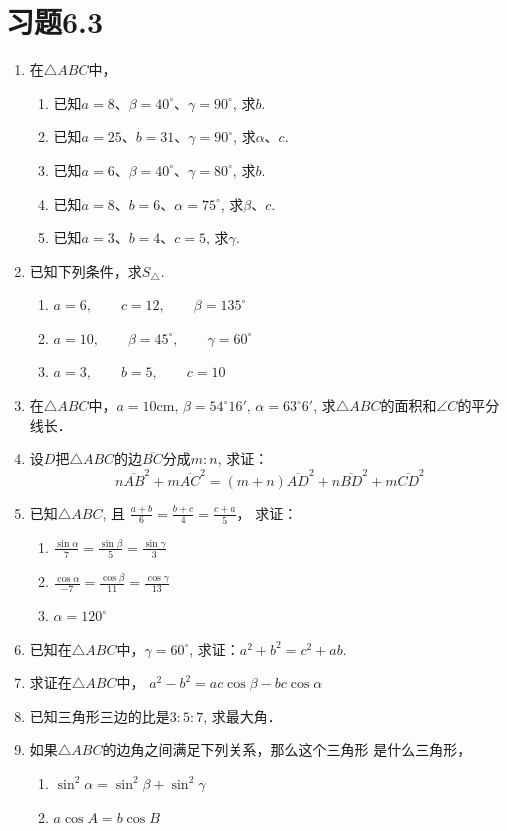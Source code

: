 \section*{习题6.3}
\begin{enumerate}
    \item 在$\triangle ABC$中，
\begin{enumerate}
    \item 已知$a=8$、$\beta=40^{\circ}$、$\gamma=90^{\circ}$, 求$b$.
    \item 已知$a=25$、$b=31$、$\gamma=90^{\circ}$, 求$\alpha$、$c$.
    \item 已知$a=6$、$\beta=40^{\circ}$、$\gamma=80^{\circ}$, 求$b$.
    \item 已知$a=8$、$b=6$、$\alpha=75^{\circ}$, 求$\beta$、$c$.
    \item 已知$a=3$、$b=4$、$c=5$, 求$\gamma$.
\end{enumerate}
\item  已知下列条件，求$S_{\triangle}$.
\begin{enumerate}
    \item $a=6,\qquad c=12,\qquad \beta =135^{\circ}$
    \item $a=10,\qquad \beta =45^{\circ},\qquad \gamma=60^{\circ}$
    \item $a=3,\qquad b=5,\qquad c=10$
\end{enumerate}

\item  在$\triangle ABC$中，$a=10$cm, $\beta =54^{\circ}16'$, $\alpha=63^{\circ}6'$, 求$\triangle ABC$的面积和$\angle C$的平分线长．
\item  设$D$把$\triangle ABC$的边$\overline{BC}$分成$m:n$, 求证：
\[n\overline{AB}^2+m \overline{AC}^2=(m+n)\overline{AD}^2+n\overline{BD}^2+m\overline{CD}^2\]
\item  已知$\triangle ABC$, 且
$\frac{a+b}{6}=\frac{b+c}{4}=\frac{c+a}{5}$，
求证：
\begin{enumerate}
    \item $\frac{\sin\alpha}{7}=\frac{\sin\beta}{5}=\frac{\sin\gamma}{3}$
    \item $\frac{\cos\alpha}{-7}=\frac{\cos\beta}{11}=\frac{\cos\gamma}{13}$
    \item $\alpha=120^{\circ}$
\end{enumerate}
\item  已知在$\triangle ABC$中，$\gamma=60^{\circ}$, 求证：$a^2+b^2=c^2+ab$.
\item  求证在$\triangle ABC$中，
$a^2-b^2=ac\cos\beta -bc\cos\alpha$
\item  已知三角形三边的比是$3:5:7$, 求最大角．
\item  如果$\triangle ABC$的边角之间满足下列关系，那么这个三角形
是什么三角形，
\begin{enumerate}
    \item $\sin^2\alpha=\sin^2\beta +\sin^2\gamma$
    \item $a\cos A=b\cos B$
\end{enumerate}


\end{enumerate}
